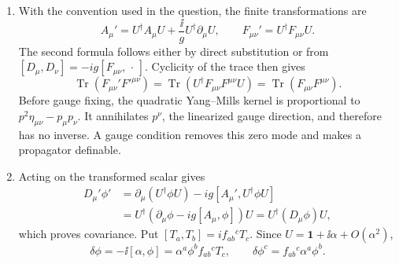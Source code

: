 \begin{enumerate}
  \begin{enumerate}
    \item[(a)] With the convention used in the question, the finite
      transformations are
      \[
        A_\mu' =U^\dagger A_\mu U
          +\frac{\ii}{g}U^\dagger\partial_\mu U,
        \qquad
        F_{\mu\nu}'=U^\dagger F_{\mu\nu}U.
      \]
      The second formula follows either by direct substitution or from
      \([D_\mu,D_\nu]=-ig[F_{\mu\nu},\,\cdot\,]\).  Cyclicity of the trace
      then gives
      \[
        \operatorname{Tr}(F_{\mu\nu}'F'^{\mu\nu})
          =\operatorname{Tr}
            (U^\dagger F_{\mu\nu}F^{\mu\nu}U)
          =\operatorname{Tr}(F_{\mu\nu}F^{\mu\nu}).
      \]
      Before gauge fixing, the quadratic Yang--Mills kernel is
      proportional to
      \(p^2\eta_{\mu\nu}-p_\mu p_\nu\).  It annihilates \(p^\nu\), the
      linearized gauge direction, and therefore has no inverse.  A gauge
      condition removes this zero mode and makes a propagator definable.

    \item[(b)] Acting on the transformed scalar gives
      \[
      \begin{split}
        D_\mu'\phi'
          &=\partial_\mu(U^\dagger\phi U)
            -ig[A_\mu',U^\dagger\phi U]\\
          &=U^\dagger(\partial_\mu\phi-ig[A_\mu,\phi])U
           =U^\dagger(D_\mu\phi)U,
      \end{split}
      \]
      which proves covariance.  Put
      \([T_a,T_b]=if_{ab}{}^cT_c\).  Since
      \(U=\mathbf{1}+\ii\alpha+O(\alpha^2)\),
      \[
        \delta\phi=-\ii[\alpha,\phi]
          =\alpha^a\phi^b f_{ab}{}^cT_c,
        \qquad
        \boxed{\delta\phi^c=f_{ab}{}^c\alpha^a\phi^b.}
      \]


\end{enumerate}
\end{enumerate}
